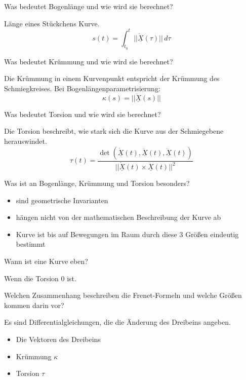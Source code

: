 \documentclass[twocolumn, fontsize=8pt, DIV=1]{scrartcl}
\begin{document}
\begin{framed}
    Was bedeutet Bogenlänge und wie wird sie berechnet?
\end{framed}
Länge eines Stückchens Kurve.
\[
    s(t) = \int_{t_0}^t ||\underline{\dot{X}}(\tau)||\, d\tau
\]



\begin{framed}
    Was bedeutet Krümmung und wie wird sie berechnet?
\end{framed}
Die Krümmung in einem Kurvenpunkt entspricht der Krümmung des Schmiegkreises. 
Bei Bogenlängenparametrisierung:
\[
    \kappa(s) = ||\underline{\ddot{X}}(s)||
\]



\begin{framed}
    Was bedeutet Torsion und wie wird sie berechnet?
\end{framed}
Die Torsion beschreibt, wie stark sich die Kurve aus der Schmiegebene herauswindet.
\[
    \tau(t) = \frac{\det(\underline{\dot{X}}(t), \underline{\ddot{X}}(t), \underline{\dddot{X}}(t))}{||\underline{\dot{X}}(t) \times \underline{\ddot{X}}(t)||^2}
\]



\begin{framed}
    Was ist an Bogenlänge, Krümmung und Torsion besonders?
\end{framed}
\begin{itemize}
    \item sind geometrische Invarianten
    \item hängen nicht von der mathematischen Beschreibung der Kurve ab
    \item Kurve ist bis auf Bewegungen im Raum durch diese 3 Größen eindeutig bestimmt
\end{itemize}



\begin{framed}
    Wann ist eine Kurve eben?
\end{framed}
Wenn die Torsion $0$ ist.



\begin{framed}
    Welchen Zusammenhang beschreiben die Frenet-Formeln und welche Größen kommen darin vor?
\end{framed}
Es sind Differentialgleichungen, die die Änderung des Dreibeins angeben.
\begin{itemize}
    \item Die Vektoren des Dreibeins
    \item Krümmung $\kappa$
    \item Torsion $\tau$
\end{itemize}
\end{document}

